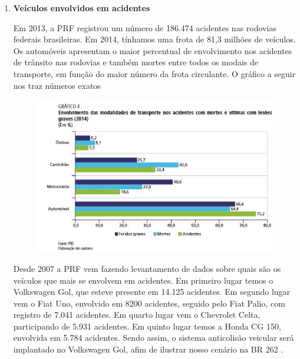 \begin{enumerate}
\item \textbf{Veículos envolvidos em acidentes}

Em 2013, a PRF registrou um número de 186.474 acidentes nas rodovias federais brasileiras. Em 2014, tínhamos uma frota de 81,3 milhões de veículos.
Os automóveis apresentam o maior percentual de envolvimento nos acidentes de trânsito nas rodovias e também mortes entre todos os modais de transporte, em função do maior número da frota circulante. O gráfico a seguir nos traz números exatos

\begin{figure}[h]
  \centering
  \includegraphics[width=400px, scale=0.5]{figuras/grafico}
  \label{table:mapa}
\end{figure}

Desde 2007 a PRF vem fazendo levantamento de dados sobre quais são os veículos que mais se envolvem em acidentes. Em primeiro lugar temos o Volkswagen Gol, que esteve presente em 14.125 acidentes. Em segundo lugar vem o Fiat Uno, envolvido em 8200 acidentes, seguido pelo Fiat Palio, com registro de 7.041 acidentes. Em quarto lugar vem o Chevrolet Celta, participando de 5.931 acidentes. Em quinto lugar temos a Honda CG 150, envolvida em 5.784 acidentes.
Sendo assim, o sistema anticolisão veicular será implantado no Volkswagen Gol, afim de ilustrar nosso cenário na BR 262 \cite{terra}.

\end{enumerate}
